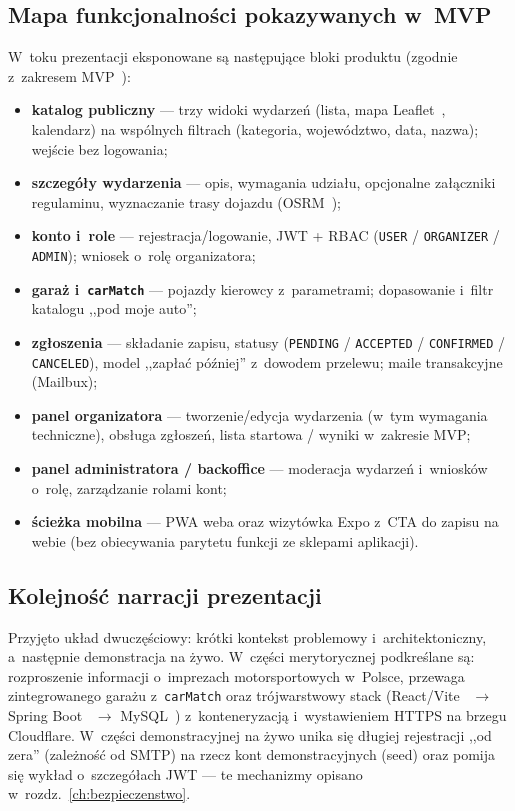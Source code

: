 \documentclass{sprz}
\begin{document}
\subsection*{Mapa funkcjonalności pokazywanych w~MVP}
W~toku prezentacji eksponowane są następujące bloki produktu (zgodnie z~zakresem MVP~\cite{raceportal:mvp}):
\begin{itemize}
  \item \textbf{katalog publiczny} --- trzy widoki wydarzeń (lista, mapa Leaflet~\cite{leaflet:docs}, kalendarz) na wspólnych filtrach (kategoria, województwo, data, nazwa); wejście bez logowania;
  \item \textbf{szczegóły wydarzenia} --- opis, wymagania udziału, opcjonalne załączniki regulaminu, wyznaczanie trasy dojazdu (OSRM~\cite{osrm:project});
  \item \textbf{konto i~role} --- rejestracja/logowanie, JWT + RBAC (\texttt{USER} / \texttt{ORGANIZER} / \texttt{ADMIN}); wniosek o~rolę organizatora;
  \item \textbf{garaż i~\texttt{carMatch}} --- pojazdy kierowcy z~parametrami; dopasowanie i~filtr katalogu ,,pod moje auto'';
  \item \textbf{zgłoszenia} --- składanie zapisu, statusy (\texttt{PENDING} / \texttt{ACCEPTED} / \texttt{CONFIRMED} / \texttt{CANCELED}), model ,,zapłać później'' z~dowodem przelewu; maile transakcyjne (Mailbux);
  \item \textbf{panel organizatora} --- tworzenie/edycja wydarzenia (w~tym wymagania techniczne), obsługa zgłoszeń, lista startowa / wyniki w~zakresie MVP;
  \item \textbf{panel administratora / backoffice} --- moderacja wydarzeń i~wniosków o~rolę, zarządzanie rolami kont;
  \item \textbf{ścieżka mobilna} --- PWA weba oraz wizytówka Expo z~CTA do zapisu na webie (bez obiecywania parytetu funkcji ze sklepami aplikacji).
\end{itemize}

\subsection*{Kolejność narracji prezentacji}
Przyjęto układ dwuczęściowy: krótki kontekst problemowy i~architektoniczny, a~następnie demonstracja na żywo. W~części merytorycznej podkreślane są: rozproszenie informacji o~imprezach motorsportowych w~Polsce, przewaga zintegrowanego garażu z~\texttt{carMatch} oraz trójwarstwowy stack (React/Vite~\cite{react:docs,vite:docs} $\rightarrow$ Spring Boot~\cite{spring:boot} $\rightarrow$ MySQL~\cite{mysql:docs}) z~konteneryzacją i~wystawieniem HTTPS na brzegu Cloudflare. W~części demonstracyjnej na żywo unika się długiej rejestracji ,,od zera'' (zależność od SMTP) na rzecz kont demonstracyjnych (seed) oraz pomija się wykład o~szczegółach JWT --- te mechanizmy opisano w~rozdz.~\ref{ch:bezpieczenstwo}.
\end{document}
